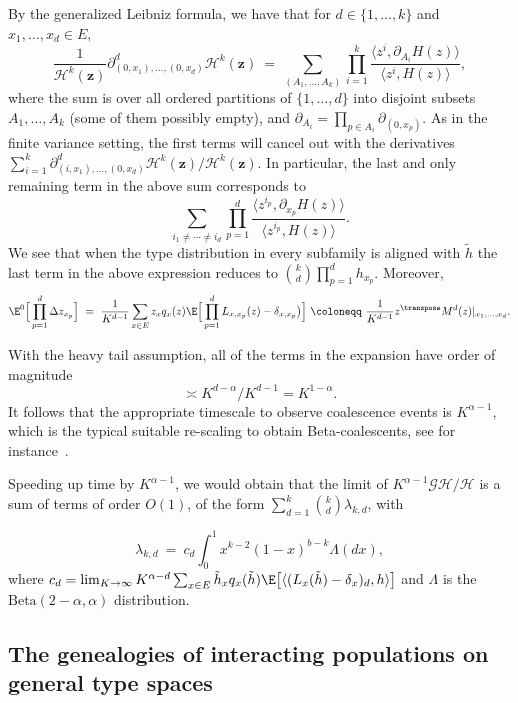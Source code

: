 By the generalized Leibniz formula,
we have that for $d\in\{1,\ldots, k\}$ and $x_1, \ldots, x_d\in E$,
\[
\frac{1}{\mathcal{H}^k(\bm z)}\partial^d_{(0, x_1),\ldots, (0, x_d)}\mathcal{H}^k(\bm z)\ =\ \sum_{(A_1, \ldots, A_k)} \prod_{i=1}^k \frac{\langle z^i, \partial_{A_i} H(z)\rangle}{\langle z^i, H(z)\rangle},
\]
where the sum is over all ordered partitions of $\{1,\ldots,d\}$ into disjoint subsets $A_1, \ldots, A_k$ (some of them possibly empty), and $\partial_{A_i}=\prod_{p\in A_i} \partial_{(0, x_p)}$.
As in the finite variance setting, the first terms will cancel out with the derivatives $\sum_{i=1}^k\partial^d_{(i, x_1),\ldots, (0, x_d)}\mathcal{H}^k(\bm z)/\mathcal{H}^k(\bm z)$.
In particular, the last and only remaining term in the above sum corresponds to 
\[
  \sum_{i_1\neq \cdots \neq i_d}   \prod_{p=1}^d \frac{\langle z^{i_p},\partial_{x_p} H(z)\rangle}{\langle z^{i_p}, H(z)\rangle}.
\]
We see that when the type distribution in every subfamily is aligned with $\tilde h$ the last term in the above expression reduces to $\binom{k}{d} \prod_{p=1}^d h_{x_p}$. Moreover, 
\[
\E^0\Big[\prod_{p=1}^d\Delta z_{x_p}\Big]\ =\ \frac{1}{K^{d-1}}\sum_{x\in E} z_x q_x(z) \E\Big[ \prod_{p=1}^d L_{x,x_p}(z) -\delta_{x, x_p}\big)\Big]\ \coloneqq \ \frac{1}{K^{d-1}} z^{\transpose} M^d(z)|_{x_1, \ldots, x_d}.
\]

With the heavy tail assumption, all of the terms in the expansion have order of magnitude 
\[
\asymp K^{d-\alpha}/K^{d-1}= K^{1-\alpha}.
\] It follows that the appropriate timescale to observe coalescence events is $K^{\alpha-1}$, which is the typical suitable re-scaling to obtain Beta-coalescents, see for instance~\citet{kersting_evolving_2014,garrett2025}.

Speeding up time by $K^{\alpha-1}$, we would obtain that the limit of $K^{\alpha-1}\mathcal{G}\mathcal{H}/\mathcal{H}$ is a sum of terms of order $O(1)$, of the form $\sum_{d=1}^k \binom{k}{d}\lambda_{k,d}$, with

\[
\lambda_{k,d} \ =\ c_d \int_0^1 x^{k-2}(1-x)^{b-k}\Lambda(dx),
\]
where $c_d=\lim_{K\to\infty} K^{\alpha-d} \sum_{x\in E}\tilde h_x q_x(\tilde h)\E\big[\langle (L_x(\tilde h)-\delta_x)_d, h \rangle\big] $ and $\Lambda$ is the $\mathrm{Beta}(2-\alpha, \alpha)$ distribution. 

 
\subsection{ The genealogies of interacting populations on general type spaces}

